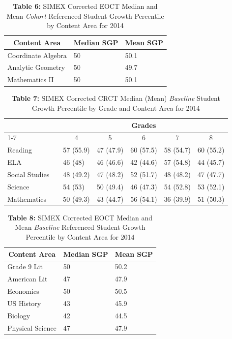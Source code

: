 \documentclass[12pt]{article}
\begin{document}
\begin{table}[H]
\caption*{\textbf{Table 6:} SIMEX Corrected EOCT Median and Mean \emph{Cohort} Referenced Student Growth Percentile by Content Area for 2014\label{table6}} 
\begin{center}
\begin{tabular}{lll}
\hline\hline
\multicolumn{1}{c}{Content Area}&\multicolumn{1}{c}{Median SGP}&\multicolumn{1}{c}{Mean SGP}\tabularnewline
\hline
Coordinate Algebra&50&50.1\tabularnewline
Analytic Geometry&50&49.7\tabularnewline
Mathematics II&50&50.1\tabularnewline
\hline
\end{tabular}\end{center}

\end{table}

\begin{table}[H]
\caption*{\textbf{Table 7:} SIMEX Corrected CRCT Median (Mean) \emph{Baseline} Student Growth Percentile by Grade and Content Area for 2014\label{table7}} 
\begin{center}
\begin{tabular}{lclllll}
\hline\hline
\multicolumn{1}{c}{\bfseries }&\multicolumn{1}{c}{\bfseries }&\multicolumn{5}{c}{\bfseries Grades}\tabularnewline
\cline{1-7}
\multicolumn{1}{c}{Content Area}&\multicolumn{1}{c}{}&\multicolumn{1}{c}{4}&\multicolumn{1}{c}{5}&\multicolumn{1}{c}{6}&\multicolumn{1}{c}{7}&\multicolumn{1}{c}{8}\tabularnewline
\hline
Reading&&57 (55.9)&47 (47.9)&60 (57.5)&58 (54.7)&60 (55.2)\tabularnewline
ELA&&46 (48)&46 (46.6)&42 (44.6)&57 (54.8)&44 (45.7)\tabularnewline
Social Studies&&48 (49.2)&47 (48.2)&52 (51.7)&48 (48.2)&47 (47.7)\tabularnewline
Science&&54 (53)&50 (49.4)&46 (47.3)&54 (52.8)&53 (52.1)\tabularnewline
Mathematics&&50 (49.3)&43 (44.7)&56 (54.1)&36 (39.9)&51 (50.3)\tabularnewline
\hline
\end{tabular}\end{center}

\end{table}

\begin{table}[H]
\caption*{\textbf{Table 8:} SIMEX Corrected EOCT Median and Mean \emph{Baseline} Referenced Student Growth Percentile by Content Area for 2014\label{table8}} 
\begin{center}
\begin{tabular}{lll}
\hline\hline
\multicolumn{1}{c}{Content Area}&\multicolumn{1}{c}{Median SGP}&\multicolumn{1}{c}{Mean SGP}\tabularnewline
\hline
Grade 9 Lit&50&50.2\tabularnewline
American Lit&47&47.9\tabularnewline
Economics&50&50.5\tabularnewline
US History&43&45.9\tabularnewline
Biology&42&44.5\tabularnewline
Physical Science&47&47.9\tabularnewline
\hline
\end{tabular}\end{center}

\end{table}
\end{document}
